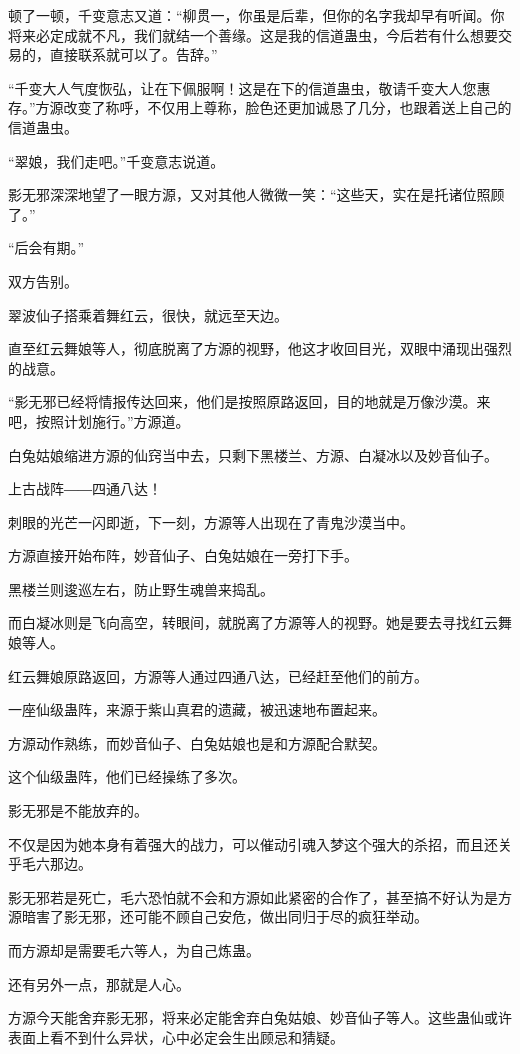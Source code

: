 \begin{this_body}
顿了一顿，千变意志又道：“柳贯一，你虽是后辈，但你的名字我却早有听闻。你将来必定成就不凡，我们就结一个善缘。这是我的信道蛊虫，今后若有什么想要交易的，直接联系就可以了。告辞。”

“千变大人气度恢弘，让在下佩服啊！这是在下的信道蛊虫，敬请千变大人您惠存。”方源改变了称呼，不仅用上尊称，脸色还更加诚恳了几分，也跟着送上自己的信道蛊虫。

“翠娘，我们走吧。”千变意志说道。

影无邪深深地望了一眼方源，又对其他人微微一笑：“这些天，实在是托诸位照顾了。”

“后会有期。”

双方告别。

翠波仙子搭乘着舞红云，很快，就远至天边。

直至红云舞娘等人，彻底脱离了方源的视野，他这才收回目光，双眼中涌现出强烈的战意。

“影无邪已经将情报传达回来，他们是按照原路返回，目的地就是万像沙漠。来吧，按照计划施行。”方源道。

白兔姑娘缩进方源的仙窍当中去，只剩下黑楼兰、方源、白凝冰以及妙音仙子。

上古战阵――四通八达！

刺眼的光芒一闪即逝，下一刻，方源等人出现在了青鬼沙漠当中。

方源直接开始布阵，妙音仙子、白兔姑娘在一旁打下手。

黑楼兰则逡巡左右，防止野生魂兽来捣乱。

而白凝冰则是飞向高空，转眼间，就脱离了方源等人的视野。她是要去寻找红云舞娘等人。

红云舞娘原路返回，方源等人通过四通八达，已经赶至他们的前方。

一座仙级蛊阵，来源于紫山真君的遗藏，被迅速地布置起来。

方源动作熟练，而妙音仙子、白兔姑娘也是和方源配合默契。

这个仙级蛊阵，他们已经操练了多次。

影无邪是不能放弃的。

不仅是因为她本身有着强大的战力，可以催动引魂入梦这个强大的杀招，而且还关乎毛六那边。

影无邪若是死亡，毛六恐怕就不会和方源如此紧密的合作了，甚至搞不好认为是方源暗害了影无邪，还可能不顾自己安危，做出同归于尽的疯狂举动。

而方源却是需要毛六等人，为自己炼蛊。

还有另外一点，那就是人心。

方源今天能舍弃影无邪，将来必定能舍弃白兔姑娘、妙音仙子等人。这些蛊仙或许表面上看不到什么异状，心中必定会生出顾忌和猜疑。


\end{this_body}
